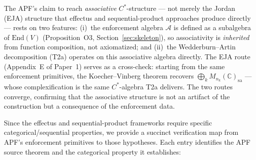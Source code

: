 \documentclass[11pt,a4paper]{article}
\theoremstyle{definition}
\newcommand{\End}{\mathrm{End}}
\begin{document}
The APF's claim to reach \emph{associative} $C^*$-structure --- not merely the Jordan (EJA) structure that effectus and sequential-product approaches produce directly --- rests on two features: (i)~the enforcement algebra $\mathcal{A}$ is defined as a subalgebra of $\End(V)$ (Proposition~O3, Section~\ref{sec:skeleton}), so associativity is \emph{inherited} from function composition, not axiomatized; and (ii)~the Wedderburn--Artin decomposition (T2a) operates on this associative algebra directly.  The EJA route (Appendix~E of Paper~1) serves as a cross-check: starting from the same enforcement primitives, the Koecher--Vinberg theorem recovers $\bigoplus_k M_{n_k}(\mathbb{C})_{\mathrm{sa}}$ --- whose complexification is the same $C^*$-algebra T2a delivers.  The two routes converge, confirming that the associative structure is not an artifact of the construction but a consequence of the enforcement data.

Since the effectus and sequential-product frameworks require specific categorical/sequential properties, we provide a succinct verification map from APF's enforcement primitives to those hypotheses.  Each entry identifies the APF source theorem and the categorical property it establishes:
\end{document}

